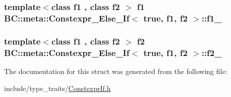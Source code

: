 \subsubsection[{\texorpdfstring{f1\+\_\+}{f1_}}]{\setlength{\rightskip}{0pt plus 5cm}template$<$class f1 , class f2 $>$ f1 {\bf B\+C\+::meta\+::\+Constexpr\+\_\+\+Else\+\_\+\+If}$<$ true, f1, f2 $>$\+::f1\+\_\+\hspace{0.3cm}{\ttfamily [mutable]}}\hypertarget{structBC_1_1meta_1_1Constexpr__Else__If_3_01true_00_01f1_00_01f2_01_4_a8cadb6539c24f01a5b05b0df987ac3f5}{}\label{structBC_1_1meta_1_1Constexpr__Else__If_3_01true_00_01f1_00_01f2_01_4_a8cadb6539c24f01a5b05b0df987ac3f5}
\subsubsection[{\texorpdfstring{f2\+\_\+}{f2_}}]{\setlength{\rightskip}{0pt plus 5cm}template$<$class f1 , class f2 $>$ f2 {\bf B\+C\+::meta\+::\+Constexpr\+\_\+\+Else\+\_\+\+If}$<$ true, f1, f2 $>$\+::f2\+\_\+}\hypertarget{structBC_1_1meta_1_1Constexpr__Else__If_3_01true_00_01f1_00_01f2_01_4_a0e4ada77a47b07b2b825749b4b1bd6cd}{}\label{structBC_1_1meta_1_1Constexpr__Else__If_3_01true_00_01f1_00_01f2_01_4_a0e4ada77a47b07b2b825749b4b1bd6cd}


The documentation for this struct was generated from the following file\+:\begin{DoxyCompactItemize}
\item 
include/type\+\_\+traits/\hyperlink{ConstexprIf_8h}{Constexpr\+If.\+h}\end{DoxyCompactItemize}
